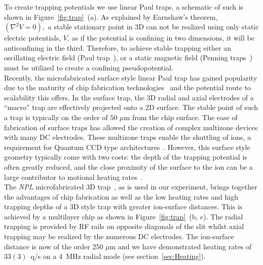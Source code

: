 \documentclass[12pt]{report}
\begin{document}
    To create trapping potentials we use linear Paul traps, a schematic of such
    is shown in Figure~\ref{fig:trap}~(a). As explained by Earnshaw's theorem,
    $(\nabla^2 V = 0),$ a stable stationary point in 3D can not be realized
    using only static electric potentials, $V$, as if the potential is confining
    in two dimensions, it will be anticonfining in the third. Therefore, to
    achieve stable trapping either an oscillating electric field (Paul
    trap~\cite{XXX}), or a static magnetic field (Penning traps~\cite{XXX}) must
    be utilized to create a confining pseudopotential.\\
    Recently, the microfabricated surface style linear Paul trap has gained
    popularity due to the maturity of chip fabrication
    technologies~\cite{allcock_surface-electrode_2011} and the potential route
    to scalability this offers. In the surface trap, the 3D radial and axial
    electrodes of a ``macro'' trap are effectively projected onto a 2D surface.
    The stable point of such a trap is typically on the order of $50$ $\mu$m
    from the chip surface. The ease of fabrication of surface traps has allowed
    the creation of complex multizone devices with many DC electrodes.  These
    multizone traps enable the shuttling of ions, a requirement for Quantum CCD
    type architectures~\cite{kielpinski_architecture_2002}. However, this
    surface style geometry typically come with two costs: the depth of the
    trapping potential is often greatly reduced, and the close proximity of the
    surface to the ion can be a large contributor to motional heating
    rates~\cite{turchette_heating_2000}. \\
    The \emph{NPL} microfabricated 3D trap~\cite{see_fabrication_2013,
    wilpers_monolithic_2012}, as is used in our experiment, brings together the
    advantages of chip fabrication as well as the low heating rates and high
    trapping depths of a 3D style trap with greater ion-surface distances. This
    is achieved by a multilayer chip as shown in Figure~\ref{fig:trap}~(b, c).
    The radial trapping is provided by RF rails on opposite diagonals of the
    slit whilst axial trapping may be realized by the numerous DC electrodes.
    The ion-surface distance is now of the order $250$ $\mu$m and we have
    demonstrated heating rates of $ 33(3)$~q/s on a 4~MHz radial mode (see
    section~\ref{sec:Heating}).
\end{document}
